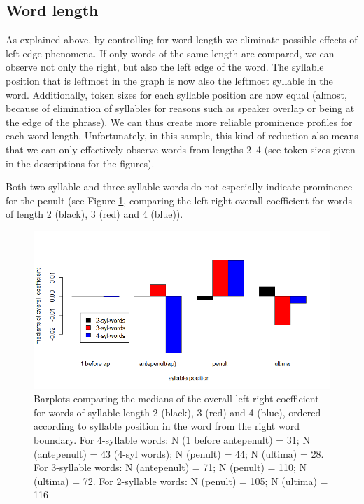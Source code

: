 \documentclass[output=paper]{LSP/langsci}
\begin{document}
\subsection{Word length} 
As explained above, by controlling for word length we eliminate possible effects of left-edge phenomena. If only words of the same length are compared, we can observe not only the right, but also the left edge of the word. The syllable position that is leftmost in the graph is now also the leftmost syllable in the word. Additionally, token sizes for each syllable position are now equal (almost, because of elimination of syllables for reasons such as speaker overlap or being at the edge of the phrase). We can thus create more reliable prominence profiles for each word length. Unfortunately, in this sample, this kind of reduction also means that we can only effectively observe words from lengths 2--4 (see token sizes given in the descriptions for the figures). 

\begin{samepage}

Both two-syllable and three-syllable words do not especially indicate prominence for the penult (see Figure \ref{fig:buc:3}, comparing the left-right overall coefficient for words of length 2 (black), 3 (red) and 4 (blue)).  

\end{samepage}

\begin{figure}
\includegraphics[width=\textwidth]{figures/BUC-img3_new.png}
 \caption{Barplots comparing the medians of the overall left-right coefficient for words of syllable length 2 (black), 3 (red) and 4 (blue), ordered according to syllable position in the word from the right word boundary. For 4-syllable words: N (1 before antepenult) = 31; N (antepenult) =  43 (4-syl words); N (penult) = 44; N (ultima) = 28. For 3-syllable words: N (antepenult) = 71; N (penult) = 110; N (ultima) = 72. For 2-syllable words: N (penult) = 105; N (ultima) = 116}
\label{fig:buc:3}
\end{figure}
\end{document}
